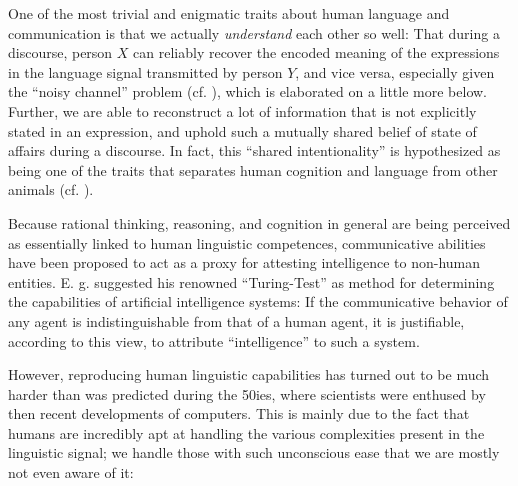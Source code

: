 
One of the most trivial and enigmatic traits about human language and communication is
that we actually \emph{understand} each other so well: That during a discourse, person
$X$ can reliably recover the encoded meaning of the expressions in the language signal
transmitted by person $Y$, and vice versa, especially given the ``noisy channel'' problem (cf.
\cite{plotkin2000language}), which is elaborated on a little more below. Further, we are
able to reconstruct a lot of information that is not explicitly stated in an expression, and
uphold such a mutually shared belief of state of affairs during a discourse. In fact,
this ``shared intentionality'' is hypothesized as being one of the traits that separates
human cognition and language from other animals (cf. \cite{tomasello2007shared}).

Because {\color{red} rational} thinking, reasoning, and cognition in general are being perceived
as essentially linked to human linguistic competences, communicative abilities have been proposed
to act as a proxy for attesting intelligence to non-human entities. E. g. \cite{turing1950computing}
suggested his renowned ``Turing-Test'' as method for determining the capabilities of artificial
intelligence systems: If the communicative behavior of any agent is indistinguishable from that of
a human agent, it is justifiable, according to this view, to attribute ``intelligence'' to such a
system.

However, reproducing human linguistic capabilities has turned out to be much harder than was
predicted during the 50ies, where scientists were enthused by then recent developments of
computers. This is mainly due to the fact that humans are incredibly apt
at handling the various complexities present in the linguistic signal; we handle those with
such unconscious ease that we are mostly not even aware of it:

